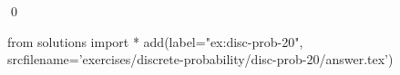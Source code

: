 
\begin{ex} 
  \label{ex:disc-prob-20}
  
  \qed
\end{ex} 
\begin{python0}
from solutions import *
add(label="ex:disc-prob-20",
    srcfilename='exercises/discrete-probability/disc-prob-20/answer.tex') 
\end{python0}
